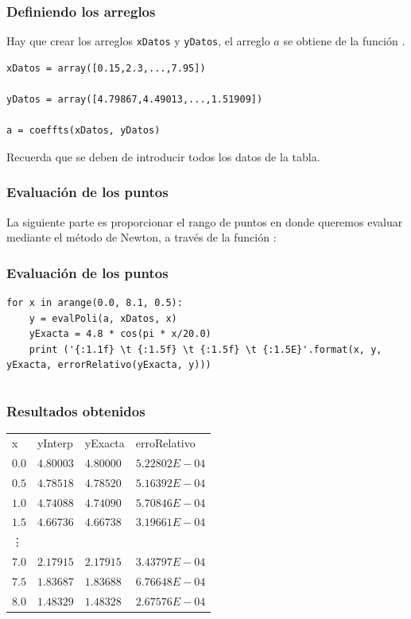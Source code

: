 \begin{frame}[fragile]
\frametitle{Definiendo los arreglos}
Hay que crear los arreglos \texttt{xDatos} y \texttt{yDatos}, el arreglo $a$ se obtiene de la función .
\begin{lstlisting}[caption=Arreglos de la tabla, style=FormattedNumber, basicstyle=\linespread{0.9}\ttfamily=\small, columns=fullflexible]
xDatos = array([0.15,2.3,...,7.95])

yDatos = array([4.79867,4.49013,...,1.51909])

a = coeffts(xDatos, yDatos)
\end{lstlisting}
Recuerda que se deben de introducir todos los datos de la tabla.
\end{frame}
\begin{frame}[fragile]
\frametitle{Evaluación de los puntos}
La siguiente parte es proporcionar el rango de puntos en donde queremos evaluar mediante el método de Newton, a través de la función :
\end{frame}
\begin{frame}[fragile]
\frametitle{Evaluación de los puntos}
\begin{lstlisting}[caption=Evaluando los puntos y el error relativo, style=FormattedNumber, basicstyle=\linespread{1.1}\ttfamily=\small, columns=fullflexible]
for x in arange(0.0, 8.1, 0.5):
    y = evalPoli(a, xDatos, x)
    yExacta = 4.8 * cos(pi * x/20.0)
    print ('{:1.1f} \t {:1.5f} \t {:1.5f} \t {:1.5E}'.format(x, y, yExacta, errorRelativo(yExacta, y)))
\end{lstlisting}
\begin{lstlisting}
\end{lstlisting}
\end{frame}
\begin{frame}
\frametitle{Resultados obtenidos}
\fontsize{12}{12}\selectfont
\begin{center}
\begin{tabular}{l l l l}
x & yInterp & yExacta & erroRelativo\\
$0.0$ & $4.80003$ & $4.80000$ & $5.22802E-04$ \\
$0.5$ & $4.78518$ & $4.78520$ & $5.16392E-04$ \\
$1.0$ & $4.74088$ & $4.74090$ & $5.70846E-04$ \\
$1.5$ & $4.66736$ & $4.66738$ & $3.19661E-04$ \\
\vdots \\
$7.0$ & $2.17915$ & $2.17915$ & $3.43797E-04$ \\
$7.5$ & $1.83687$ & $1.83688$ & $6.76648E-04$ \\
$8.0$ & $1.48329$ & $1.48328$ & $2.67576E-04$
\end{tabular}
\end{center}
\end{frame}
